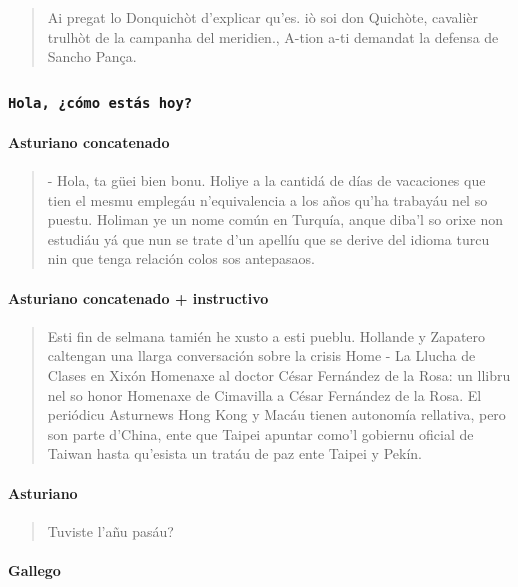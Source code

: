 \begin{quote}
Ai pregat lo Donquichòt d'explicar qu'es. iò soi don Quichòte, cavalièr trulhòt de la campanha del meridien., A-tion a-ti demandat la defensa de Sancho Pança.
\end{quote}

\subsubsection{\fontsize{15}{15}\texttt{Hola, ¿cómo estás hoy?}}

\paragraph{Asturiano concatenado}

\begin{quote}
- Hola, ta güei bien bonu.
Holiye a la cantidá de días de vacaciones que tien el mesmu emplegáu n'equivalencia a los años qu'ha trabayáu nel so puestu.
Holiman ye un nome común en Turquía, anque diba'l so orixe non estudiáu yá que nun se trate d'un apellíu que se derive del idioma turcu nin que tenga relación colos sos antepasaos.
\end{quote}

\paragraph{Asturiano concatenado + instructivo}

\begin{quote}
Esti fin de selmana tamién he xusto a esti pueblu.
Hollande y Zapatero caltengan una llarga conversación sobre la crisis
Home - La Llucha de Clases en Xixón
Homenaxe al doctor César Fernández de la Rosa: un llibru nel so honor
Homenaxe de Cimavilla a César Fernández de la Rosa. El periódicu Asturnews
Hong Kong y Macáu tienen autonomía rellativa, pero son parte d'China, ente que Taipei apuntar como'l gobiernu oficial de Taiwan hasta qu'esista un tratáu de paz ente Taipei y Pekín.
\end{quote}

\paragraph{Asturiano}

\begin{quote}
Tuviste l’añu pasáu?
\end{quote}

\paragraph{Gallego}


